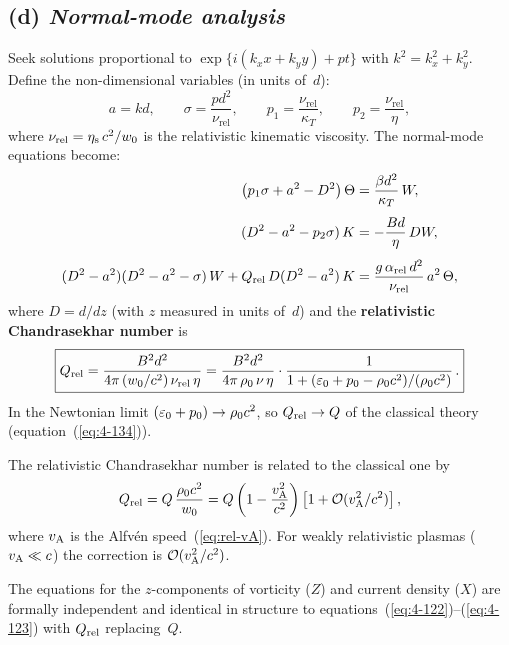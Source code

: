 \subsection*{(d) \emph{Normal-mode analysis}}

Seek solutions proportional to
$\exp\{i(k_{x}x+k_{y}y)+pt\}$ with $k^{2}=k_{x}^{2}+k_{y}^{2}$.
Define the non-dimensional variables (in units of~$d$):
\begin{equation}\label{eq:rel-118}
  a = kd,\qquad
  \sigma = \frac{pd^{2}}{\nu_{\text{rel}}},\qquad
  p_{1} = \frac{\nu_{\text{rel}}}{\kappa_{T}},\qquad
  p_{2} = \frac{\nu_{\text{rel}}}{\eta},
\end{equation}
where $\nu_{\text{rel}}=\eta_{\mathrm{s}}\,c^{2}/w_{0}$ is the
relativistic kinematic viscosity.
The normal-mode equations become:
\begin{align}
  \bigl(p_{1}\sigma+a^{2}-D^{2}\bigr)\,\Theta
  &= \frac{\beta d^{2}}{\kappa_{T}}\,W,
  \label{eq:rel-119}\\[4pt]
  (D^{2}-a^{2}-p_{2}\sigma)\,K
  &= -\frac{Bd}{\eta}\,DW,
  \label{eq:rel-120}\\[4pt]
  (D^{2}-a^{2})(D^{2}-a^{2}-\sigma)\,W
  + Q_{\mathrm{rel}}\,D(D^{2}-a^{2})\,K
  &= \frac{g\,\alpha_{\text{rel}}\,d^{2}}{\nu_{\text{rel}}}\,
     a^{2}\,\Theta,
  \label{eq:rel-121}
\end{align}
where $D=d/dz$ (with $z$ measured in units of~$d$) and the
\textbf{relativistic Chandrasekhar number} is
\begin{equation}\label{eq:rel-Qrel-def}
  \boxed{
  Q_{\mathrm{rel}}
  = \frac{B^{2}d^{2}}{4\pi\,(w_{0}/c^{2})\,\nu_{\text{rel}}\,\eta}
  = \frac{B^{2}d^{2}}{4\pi\,\rho_0\,\nu\,\eta}
    \cdot\frac{1}{1+(\varepsilon_{0}+p_{0}-\rho_0 c^{2})/(\rho_0 c^{2})}\,.
  }
\end{equation}
In the Newtonian limit $(\varepsilon_{0}+p_{0})\to\rho_0 c^{2}$,
so $Q_{\mathrm{rel}}\to Q$ of the classical theory (equation~(\ref{eq:4-134})).

\begin{relcorrection}
The relativistic Chandrasekhar number is related to the classical
one by
\[
  Q_{\mathrm{rel}}
  = Q\,\frac{\rho_0 c^{2}}{w_{0}}
  = Q\,\biggl(1-\frac{v_{\mathrm{A}}^{2}}{c^{2}}\biggr)
    \left[1 + \mathcal{O}(v_{\mathrm{A}}^{2}/c^{2})\right],
\]
where $v_{\mathrm{A}}$ is the Alfv\'en speed~(\ref{eq:rel-vA}).
For weakly relativistic plasmas ($v_{\mathrm{A}}\ll c$) the correction is
$\mathcal{O}(v_{\mathrm{A}}^{2}/c^{2})$.
\end{relcorrection}

The equations for the $z$-components of vorticity ($Z$) and
current density ($X$) are formally independent and identical in
structure to equations~(\ref{eq:4-122})--(\ref{eq:4-123}) with
$Q_{\mathrm{rel}}$ replacing~$Q$.

